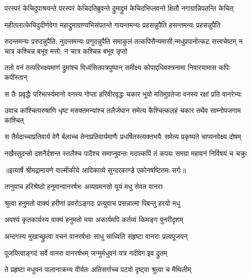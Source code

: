 \fourlineindentedshloka
{परस्परं केचिदुपाश्रयन्ते}
{ परस्परं केचिदतिब्रुवन्ते}
{द्रुमाद्द्रुमं केचिदभिप्लवन्ते}
{ क्षितौ नगाग्रान्निपतन्ति केचित्} %

\fourlineindentedshloka
{महीतलात्केचिदुदीर्णवेगा}
{ महाद्रुमाग्राण्यभिसंपतन्ते}
{गायन्तमन्यः प्रहसन्नुपैति}
{ हसन्तमन्यः प्रहसन्नुपैति} %

\threelineshloka
{रुदन्तमन्यः प्ररुदन्नुपैति; नुदन्तमन्यः प्रणुदन्नुपैति}
{समाकुलं तत्कपिसैन्यमासी;न्मधुप्रपानोत्कट सत्त्वचेष्टम्}
{न चात्र कश्चिन्न बभूव मत्तो; न चात्र कश्चिन्न बभूव तृप्तो} %

\fourlineindentedshloka
{ततो वनं तत्परिभक्ष्यमाणं}
{ द्रुमांश्च विध्वंसितपत्रपुष्पान्}
{समीक्ष्य कोपाद्दधिवक्त्रनामा}
{ निवारयामास कपिः कपींस्तान्} %

\fourlineindentedshloka
{स तैः प्रवृद्धैः परिभर्त्स्यमानो}
{ वनस्य गोप्ता हरिवीरवृद्धः}
{चकार भूयो मतिमुग्रतेजा}
{ वनस्य रक्षां प्रति वानरेभ्यः} %

\fourlineindentedshloka
{उवाच कांश्चित्परुषाणि धृष्ट}
{मसक्तमन्यांश्च तलैर्जघान}
{समेत्य कैश्चित्कलहं चकार}
{ तथैव साम्नोपजगाम कांश्चित्} %

\fourlineindentedshloka
{स तैर्मदाच्चाप्रतिवार्य वेगै}
{र्बलाच्च तेनाप्रतिवार्यमाणैः}
{प्रधर्षितस्त्यक्तभयैः समेत्य}
{ प्रकृष्यते चाप्यनवेक्ष्य दोषम्} %

\fourlineindentedshloka
{नखैस्तुदन्तो दशनैर्दशन्त}
{स्तलैश्च पादैश्च समाप्नुवन्तः}
{मदात्कपिं तं कपयः समग्रा}
{ महावनं निर्विषयं च चक्रुः} %


{॥इत्यार्षे श्रीमद्रामायणे वाल्मीकीये आदिकाव्ये सुन्दरकाण्डे एकोनषष्टितमः सर्गः॥}


\twolineshloka
{तानुवाच हरिश्रेष्ठो हनूमान्वानरर्षभः}
{अव्यग्रमनसो यूयं मधु सेवत वानराः} %

\twolineshloka
{श्रुत्वा हनुमतो वाक्यं हरीणां प्रवरोऽङ्गदः}
{प्रत्युवाच प्रसन्नात्मा पिबन्तु हरयो मधु} %

\twolineshloka
{अवश्यं कृतकार्यस्य वाक्यं हनुमतो मया}
{अकार्यमपि कर्तव्यं किमङ्ग पुनरीदृशम्} %

\twolineshloka
{अन्दगस्य मुखाच्छ्रुत्वा वचनं वानरर्षभाः}
{साधु साध्विति संहृष्टा वानराः प्रत्यपूजयन्} %

\twolineshloka
{पूजयित्वाङ्गदं सर्वे वानरा वानरर्षभम्}
{जग्मुर्मधुवनं यत्र नदीवेग इव द्रुतम्} %

\twolineshloka
{ते प्रहृष्टा मधुवनं पालानाक्रम्य वीर्यतः}
{अतिसर्गाच्च पटवो दृष्ट्वा श्रुत्वा च मैथिलीम्} %

